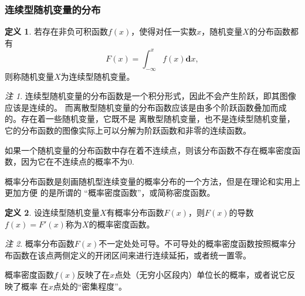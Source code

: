 \documentclass[a4paper,11pt]{article}%
\theoremstyle{remark}
\newtheorem*{remark}{注}
\theoremstyle{remark}
\theoremstyle{definition}
\theoremstyle{definition}
\newtheorem*{definition}{定义}
\theoremstyle{plain}
\begin{document}
\subsubsection{连续型随机变量的分布}
\begin{definition}
    若存在非负可积函数$f(x)$，使得对任一实数$x$，随机变量$X$的分布函数都有
    \[F(x)=\int_{-\infty}^{x}f(x)\mathbf{d}x,\]
    则称随机变量$X$为连续型随机变量。
\end{definition}
\begin{remark}
    连续型随机变量的分布函数是一个积分形式，因此不会产生阶跃，即其图像应该是连续的。
    而离散型随机变量的分布函数应该是由多个阶跃函数叠加而成的。存在着一些随机变量，它既不是
    离散型随机变量，也不是连续型随机变量，它的分布函数的图像实际上可以分解为阶跃函数和非零的连续函数。
    
    如果一个随机变量的分布函数中存在着不连续点，则该分布函数不存在概率密度函数，因为它在不连续点的概率不为0.
\end{remark}
概率分布函数是刻画随机型连续变量的概率分布的一个方法，但是在理论和实用上更加方便
的是所谓的 ``概率密度函数''，或简称密度函数。
\begin{definition}
    设连续型随机变量$X$有概率分布函数$F(x)$，则$F(x)$的导数$f(x)=F'(x)$称为$X$的概率密度函数。
\end{definition}
\begin{remark}
    概率分布函数$F(x)$不一定处处可导。不可导处的概率密度函数按照概率分布函数在该点两侧定义的开闭区间来进行连续延拓，或者统一置零。
\end{remark}
概率密度函数$f(x)$反映了在$x$点处（无穷小区段内）单位长的概率，或者说它反映了概率
在$x$点处的``密集程度''。
\end{document}
